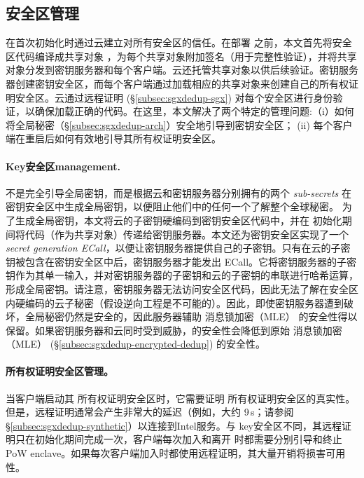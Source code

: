 \subsection{安全区管理}
\label{subsec:sgxdedup-enclave-management}

\sysnameS 在首次初始化时通过云建立对所有安全区的信任。在部署 \sysnameS 之前，本文首先将安全区代码编译成共享对象 \cite{sgx}，为每个共享对象附加签名（用于完整性验证），并将共享对象分发到密钥服务器和每个客户端。云还托管共享对象以供后续验证。密钥服务器创建密钥安全区，而每个客户端通过加载相应的共享对象来创建自己的所有权证明安全区。云通过远程证明 (\S\ref{subsec:sgxdedup-sgx}) 对每个安全区进行身份验证，以确保加载正确的代码。在这里，本文解决了两个特定的管理问题:（i）如何将全局秘密（\S\ref{subsec:sgxdedup-arch}）安全地引导到密钥安全区； (ii) 每个客户端在重启后如何有效地引导其所有权证明安全区。

\paragraph*{Key安全区management.} \sysnameS 不是完全引导全局密钥，而是根据云和密钥服务器分别拥有的两个 \textit{ sub-secrets} 在密钥安全区中生成全局密钥，以便阻止他们中的任何一个了解整个全球秘密。
为了生成全局密钥，本文将云的子密钥硬编码到密钥安全区代码中，并在 \sysnameS 初始化期间将代码（作为共享对象）传递给密钥服务器。本文还为密钥安全区实现了一个\textit{ secret generation ECall}，以便让密钥服务器提供自己的子密钥。只有在云的子密钥被包含在密钥安全区中后，密钥服务器才能发出 ECall。它将密钥服务器的子密钥作为其单一输入，并对密钥服务器的子密钥和云的子密钥的串联进行哈希运算，形成全局密钥。请注意，密钥服务器无法访问安全区代码，因此无法了解在安全区内硬编码的云子秘密（假设逆向工程是不可能的）。因此，即使密钥服务器遭到破坏，全局秘密仍然是安全的，因此服务器辅助 消息锁加密（MLE） 的安全性得以保留。如果密钥服务器和云同时受到威胁，\sysnameS 的安全性会降低到原始 消息锁加密（MLE） (\S\ref{subsec:sgxdedup-encrypted-dedup}) 的安全性。

\paragraph*{所有权证明安全区管理。} 当客户端启动其 所有权证明安全区时，它​​需要证明 所有权证明安全区的真实性。但是，远程证明通常会产生非常大的延迟（例如，大约 9\,s；请参阅 \S\ref{subsec:sgxdedup-synthetic}）以连接到Intel服务。与 key安全区不同，其远程证明只在初始化期间完成一次，客户端每次加入和离开 \sysnameS 时都需要分别引导和终止 PoW enclave。如果每次客户端加入时都使用远程证明，其大量开销将损害可用性。

